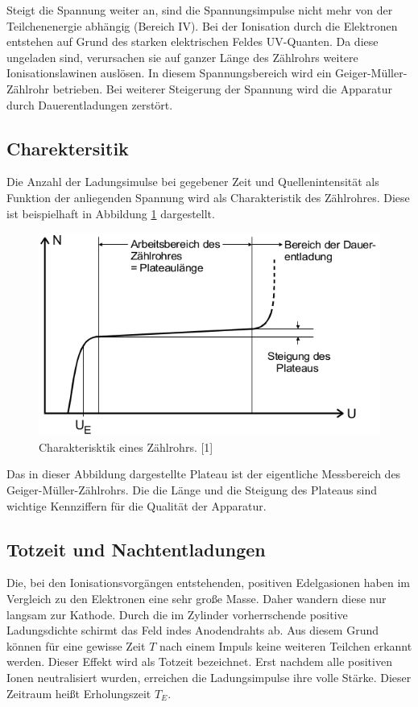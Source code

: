 \documentclass[11pt,ngerman,a4paper]{article}
\begin{document}
Steigt die Spannung weiter an, sind die Spannungsimpulse nicht mehr von der Teilchenenergie abhängig (Bereich IV). Bei der Ionisation durch die Elektronen entstehen auf Grund des starken elektrischen Feldes UV-Quanten. Da diese ungeladen sind, verursachen sie auf ganzer Länge des Zählrohrs weitere Ionisationslawinen auslösen. In diesem Spannungsbereich wird ein Geiger-Müller-Zählrohr betrieben.
Bei weiterer Steigerung der Spannung wird die Apparatur durch Dauerentladungen zerstört.
\subsection{Charektersitik}
Die Anzahl der Ladungsimulse bei gegebener Zeit und Quellenintensität als Funktion der anliegenden Spannung wird als Charakteristik des Zählrohres. Diese ist beispielhaft in Abbildung \ref{abb3} dargestellt.
\begin{figure}[htp]
\centering
\includegraphics[scale=0.60]{abb3.png}
\caption{Charakterisktik eines Zählrohrs. [1]}
\label{abb3}
\end{figure}
Das in dieser Abbildung dargestellte Plateau ist der eigentliche Messbereich des Geiger-Müller-Zählrohrs. Die die Länge und die Steigung des Plateaus sind wichtige Kennziffern für die Qualität der Apparatur.
 
\subsection{Totzeit und Nachtentladungen}

Die, bei den Ionisationsvorgängen entstehenden, positiven Edelgasionen haben im Vergleich zu den Elektronen eine sehr große Masse. Daher wandern diese nur langsam zur Kathode. Durch die im Zylinder vorherrschende positive Ladungsdichte schirmt das Feld indes Anodendrahts ab. Aus diesem Grund können für eine gewisse Zeit $T$ nach einem Impuls keine weiteren Teilchen erkannt werden. Dieser Effekt wird als Totzeit bezeichnet. Erst nachdem alle positiven Ionen neutralisiert wurden, erreichen die Ladungsimpulse ihre volle Stärke. Dieser Zeitraum heißt Erholungszeit $T_E$.
\end{document}
